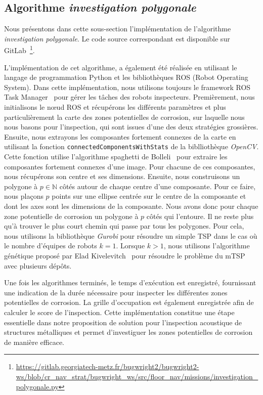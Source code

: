 \documentclass[francais,RandD]{rapportPFE}
\begin{document}
		\subsection*{Algorithme \textit{investigation polygonale}}
			Nous présentons dans cette sous-section l'implémentation de l'algorithme \textit{investigation polygonale}.
			Le code source correspondant est disponible sur GitLab~\footnote{\url{https://gitlab.georgiatech-metz.fr/bugwright2/bugwright2-ws/blob/cr_nav_strat/bugwright_ws/src/floor_nav/missions/investigation_polygonale.py}}.

			L'implémentation de cet algorithme, a également été réalisée en utilisant le langage de programmation Python et les bibliothèques ROS (Robot Operating System).
			Dans cette implémentation, nous utilisons toujours le framework ROS Task Manager~\cite{ROSTaskManager} pour gérer les tâches des robots inspecteurs.
			Premièrement, nous initialisons le nœud ROS et récupérons les différents paramètres et plus particulièrement la carte des zones potentielles de corrosion, sur laquelle nous nous basons pour l'inspection, qui sont issues d'une des deux stratégies grossières.
			Ensuite, nous extrayons les composantes fortement connexes de la carte en utilisant la fonction \texttt{connectedComponentsWithStats} de la biblliothèque \textit{OpenCV}.
			Cette fonction utilise l'algorithme spaghetti de Bolleli~\cite{BolelliSpaghetti} pour extraire les composantes fortement connexes d'une image.
			Pour chacune de ces composantes, nous récupérons son centre et ses dimensions.
			Ensuite, nous construisons un polygone à $p \in \mathbb{N}$ côtés autour de chaque centre d'une composante.
			Pour ce faire, nous plaçons $p$ points sur une ellipse centrée sur le centre de la composante et dont les axes sont les dimensions de la composante.
			Nous avons donc pour chaque zone potentielle de corrosion un polygone à $p$ côtés qui l'entoure.
			Il ne reste plus qu'à trouver le plus court chemin qui passe par tous les polygones.
			Pour cela, nous utilisons la bibliothèque \textit{Gurobi} pour résoudre un simple TSP dans le cas où le nombre d'équipes de robots $k = 1$.
			Lorsque $k > 1$, nous utilisons l'algorithme génétique proposé par Elad Kivelevitch~\cite{MDMTSPV_GA} pour résoudre le problème du mTSP avec plusieurs dépôts.

			Une fois les algorithmes terminés, le temps d'exécution est enregistré, fournissant une indication de la durée nécessaire pour inspecter les différentes zones potentielles de corrosion.
			La grille d'occupation est également enregistrée afin de calculer le score de l'inspection.
			Cette implémentation constitue une étape essentielle dans notre proposition de solution pour l'inspection acoustique de structures métalliques et permet d'investiguer les zones potentielles de corrosion de manière efficace.
\end{document}
